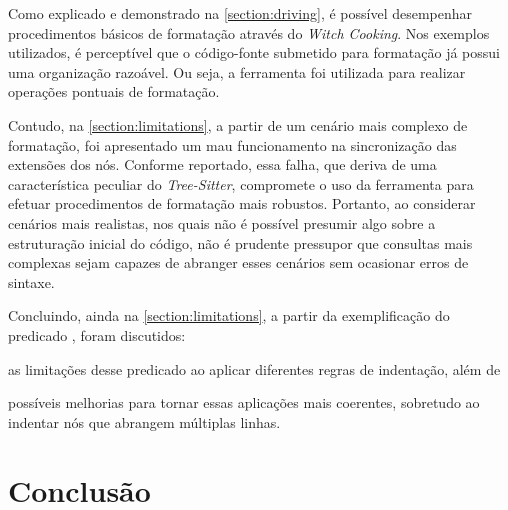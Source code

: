 \documentclass
  [11pt,a4paper,english,brazil,openright,sumario=tradicional,twoside]
  {abntex2}
\newcommand{\treesitter}{\textit{Tree-Sitter}\xspace}
\newcommand{\witchcooking}{\textit{Witch Cooking}\xspace}
\renewcommand{\postextual}{}
\begin{document}
  Como explicado e demonstrado na \cref{section:driving}, é possível
  desempenhar procedimentos básicos de formatação através do \witchcooking. Nos
  exemplos utilizados, é perceptível que o código-fonte submetido para
  formatação já possui uma organização razoável. Ou seja, a ferramenta foi
  utilizada para realizar operações pontuais de formatação.

  Contudo, na \cref{section:limitations}, a partir de um cenário mais complexo
  de formatação, foi apresentado um mau funcionamento na sincronização das
  extensões dos nós. Conforme reportado, essa falha, que deriva de uma
  característica peculiar do \treesitter, compromete o uso da ferramenta para
  efetuar procedimentos de formatação mais robustos. Portanto, ao considerar
  cenários mais realistas, nos quais não é possível presumir algo sobre a
  estruturação inicial do código, não é prudente pressupor que consultas mais
  complexas sejam capazes de abranger esses cenários sem ocasionar erros de
  sintaxe.

  Concluindo, ainda na \cref{section:limitations}, a partir da exemplificação
  do predicado , foram discutidos:
  \begin{inparaenum}
    \item as limitações desse predicado ao aplicar diferentes regras de
          indentação, além de
    \item possíveis melhorias para tornar essas aplicações mais coerentes,
          sobretudo ao indentar nós que abrangem múltiplas linhas.
  \end{inparaenum}


  \chapter{Conclusão}


  \postextual
  \printbibliography

\end{document}
